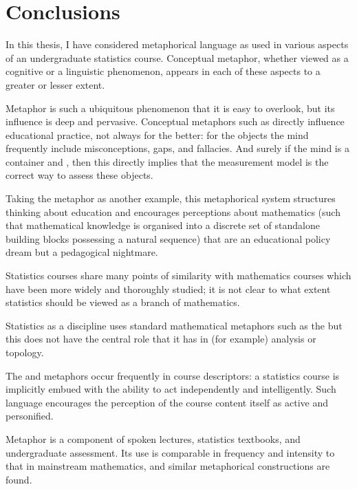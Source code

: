 \chapter{Conclusions}
\label{chapter8}

In this thesis, I have considered metaphorical language as used in
various aspects of an undergraduate statistics course.  Conceptual
metaphor, whether viewed as a cognitive or a linguistic phenomenon,
appears in each of these aspects to a greater or lesser extent.

Metaphor is such a ubiquitous phenomenon that it is easy to overlook,
but its influence is deep and pervasive.  Conceptual metaphors such as
 directly influence educational
practice, not always for the better: for the objects  the
mind frequently include misconceptions, gaps, and fallacies.  And
surely if the mind is a container and ,
then this directly implies that the measurement model is the correct
way to assess these objects.

Taking the  metaphor as another example, this
metaphorical system structures thinking about education and encourages
perceptions about mathematics (such that mathematical knowledge is
organised into a discrete set of standalone building blocks possessing
a natural sequence) that are an educational policy dream but a
pedagogical nightmare.

Statistics courses share many points of similarity with mathematics
courses which have been more widely and thoroughly studied; it is not
clear to what extent statistics should be viewed as a branch of
mathematics.

Statistics as a discipline uses standard mathematical metaphors such
as the  but this does not have the
central role that it has in (for example) analysis or topology.  

The  and  metaphors occur
frequently in course descriptors: a statistics course is implicitly
embued with the ability to act independently and intelligently.  Such
language encourages the perception of the course content itself as
active and personified. 

Metaphor is a component of spoken lectures, statistics textbooks, and
undergraduate assessment.  Its use is comparable in frequency and
intensity to that in mainstream mathematics, and similar metaphorical
constructions are found.


